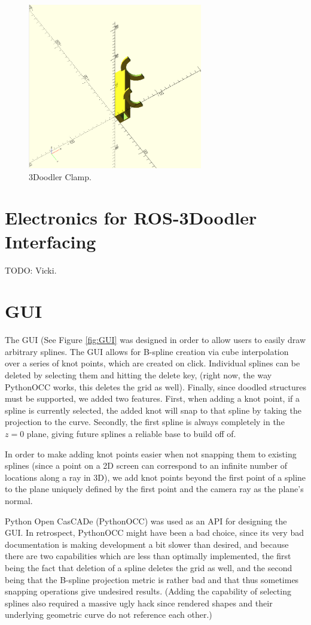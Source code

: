 \documentclass[conference]{acmsiggraph}
\begin{document}
\begin{figure}[ht]
  \centering
  \includegraphics[width=3.0in]{images/clamp.png}
  \caption{3Doodler Clamp.}
  \label{fig:clamp}
\end{figure}


\section{Electronics for ROS-3Doodler Interfacing}
TODO: Vicki.

\section{GUI}
The GUI (See Figure \ref{fig:GUI} was designed in order to allow users to easily draw arbitrary splines.  The GUI allows for B-spline creation via cube interpolation over a series of knot points, which are created on click.  Individual splines can be deleted by selecting them and hitting the delete key, (right now, the way PythonOCC works, this deletes the grid as well).  Finally, since doodled structures must be supported, we added two features.  First, when adding a knot point, if a spline is currently selected, the added knot will snap to that spline by taking the projection to the curve.  Secondly, the first spline is always completely in the $z=0$ plane, giving future splines a reliable base to build off of.

In order to make adding knot points easier when not snapping them to existing splines (since a point on a 2D screen can correspond to an infinite number of locations along a ray in 3D), we add knot points beyond the first point of a spline to the plane uniquely defined by the first point and the camera ray as the plane's normal.

Python Open CasCADe (PythonOCC) was used as an API for designing the GUI.  In retrospect, PythonOCC might have been a bad choice, since its very bad documentation is making development a bit slower than desired, and because there are two capabilities which are less than optimally implemented, the first being the fact that deletion of a spline deletes the grid as well, and the second being that the B-spline projection metric is rather bad and that thus sometimes snapping operations give undesired results.  (Adding the capability of selecting splines also required a massive ugly hack since rendered shapes and their underlying geometric curve do not reference each other.)
\end{document}
